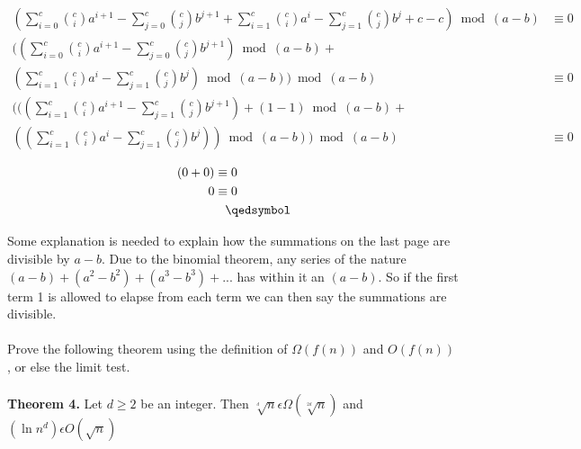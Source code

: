 \documentclass[12pt]{article}
\begin{document}
\begin{enumerate}
\begin{align*}
(\sum\limits_{i = 0}^{c} {c \choose i} a^{i+1} - \sum\limits_{j = 0}^{c} {c \choose j} b^{j+1} + \sum\limits_{i = 1}^{c} {c \choose i} a^i - \sum\limits_{j = 1}^{c} {c \choose j} b^j + c - c)\bmod{(a-b)} &\equiv 0\\
((\sum\limits_{i = 0}^{c} {c \choose i} a^{i+1} - \sum\limits_{j = 0}^{c} {c \choose j} b^{j+1})\bmod{(a-b)} +\\ (\sum\limits_{i = 1}^{c} {c \choose i} a^i - \sum\limits_{j = 1}^{c} {c \choose j} b^j)\bmod{(a-b)})\bmod{(a-b)} &\equiv 0\\
(((\sum\limits_{i = 1}^{c} {c \choose i} a^{i + 1} - \sum\limits_{j = 1}^{c} {c \choose j} b^{j + 1}) + (1 - 1)\bmod{(a-b)} +\\ ((\sum\limits_{i = 1}^{c} {c \choose i} a^{i} - \sum\limits_{j = 1}^{c} {c \choose j} b^{j}))\bmod{(a-b)})\bmod{(a-b)} &\equiv 0\\
\end{align*}
\begin{align*}
(0 + 0) &\equiv 0\\
0 &\equiv 0 \\
&\hspace{0.3cm}\qedsymbol
\end{align*}
\end{enumerate}
Some explanation is needed to explain how the summations on the last page are divisible by \begin{math} a - b\end{math}. Due to the binomial theorem, any series of the nature \begin{math} (a - b) + (a^2 - b^2) + (a^3 - b^3) + ...  \end{math} has within it an \begin{math} (a - b) \end{math}. So if the first term 1 is allowed to elapse from each term we can then say the summations are divisible.\\\\
Prove the following theorem using the definition of \begin{math} \Omega (f (n))\end{math} and \begin{math}O(f (n))\end{math} , or else the limit test.\\\\
\noindent \textbf{Theorem 4.} Let \begin{math}d \geq 2\end{math} be an integer. Then \begin{math}\sqrt[^d]{n} \epsilon \Omega (\sqrt[^{2d}]{n})\end{math} and \begin{math}(\ln {n}^d) \epsilon O(\sqrt{n})\end{math}\\\\
\end{document}
